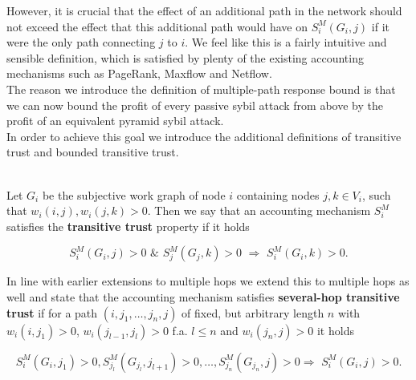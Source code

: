 \noindent{}However, it is crucial that the effect of an additional path in the network should not exceed the effect that this additional path would have on $S^M_i(G_i,j)$ if it were the only path connecting $j$ to $i$. We feel like this is a fairly intuitive and sensible definition, which is satisfied by plenty of the existing accounting mechanisms such as PageRank, Maxflow and Netflow. \vspace{1em}\\

\noindent{}The reason we introduce the definition of multiple-path response bound is that we can now bound the profit of every passive sybil attack from above by the profit of an equivalent pyramid sybil attack. \vspace{1em}\\

\noindent{}In order to achieve this goal we introduce the additional definitions of transitive trust and bounded transitive trust. \vspace{1em}\\

\begin{definition}\ \\
\label{def:Transitive Trust}
\noindent{}Let $G_i$ be the subjective work graph of node $i$ containing nodes $j,k\in{}V_i$, such that $w_i(i,j),w_i(j,k)>0$. Then we say that an accounting mechanism $S^M_i$ satisfies the \textbf{transitive trust} property if it holds

\[
S^M_i(G_i,j)>0\,\,\&\,\,S^M_j(G_j,k)>0\,\,\Rightarrow\,\,S^M_i(G_i,k)>0.
\]

\noindent{}In line with earlier extensions to multiple hops we extend this to multiple hops as well and state that the accounting mechanism satisfies \textbf{several-hop transitive trust} if for a path $(i,j_1,\ldots,j_n,j)$ of fixed, but arbitrary length $n$ with $w_i(i,j_1)>0$, $w_i(j_{l-1},j_l)>0$ f.a. $l\leq{}n$ and $w_i(j_n,j)>0$ it holds  

\[
S^M_i(G_i,j_1)>0, S^M_{j_l}(G_{j_l},j_{l+1})>0, \ldots , S^M_{j_n}(G_{j_n},j)>0\Rightarrow\,\,S^M_i(G_i,j)>0.
\]
\end{definition}

